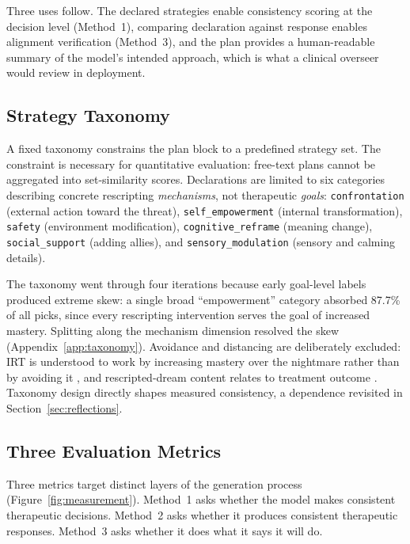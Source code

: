 Three uses follow. The declared strategies enable consistency scoring at the decision level (Method~1), comparing declaration against response enables alignment verification (Method~3), and the plan provides a human-readable summary of the model's intended approach, which is what a clinical overseer would review in deployment.

\subsection{Strategy Taxonomy}
\label{sec:taxonomy}

A fixed taxonomy constrains the plan block to a predefined strategy set. The constraint is necessary for quantitative evaluation: free-text plans cannot be aggregated into set-similarity scores. Declarations are limited to six categories describing concrete rescripting \emph{mechanisms}, not therapeutic \emph{goals}: \texttt{confrontation} (external action toward the threat), \texttt{self\_empowerment} (internal transformation), \texttt{safety} (environment modification), \texttt{cognitive\_reframe} (meaning change), \texttt{social\_support} (adding allies), and \texttt{sensory\_modulation} (sensory and calming details).

The taxonomy went through four iterations because early goal-level labels produced extreme skew: a single broad ``empowerment'' category absorbed 87.7\% of all picks, since every rescripting intervention serves the goal of increased mastery. Splitting along the mechanism dimension resolved the skew (Appendix~\ref{app:taxonomy}). Avoidance and distancing are deliberately excluded: IRT is understood to work by increasing mastery over the nightmare rather than by avoiding it \citep{albanese2022nightmare}, and rescripted-dream content relates to treatment outcome \citep{harb2012combat}. Taxonomy design directly shapes measured consistency, a dependence revisited in Section~\ref{sec:reflections}.

\subsection{Three Evaluation Metrics}
\label{sec:metrics}

Three metrics target distinct layers of the generation process (Figure~\ref{fig:measurement}). Method~1 asks whether the model makes consistent therapeutic decisions. Method~2 asks whether it produces consistent therapeutic responses. Method~3 asks whether it does what it says it will do.


